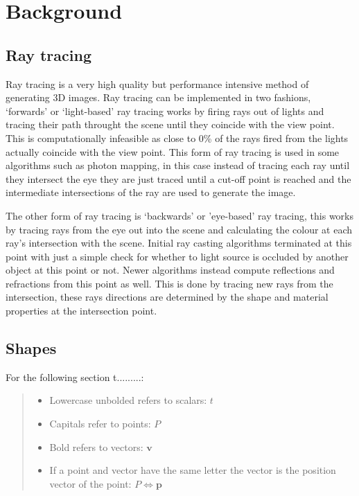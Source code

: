 \section{Background}
  \subsection{Ray tracing}
    Ray tracing is a very high quality but performance intensive method of
    generating 3D images.  Ray tracing can be implemented in two fashions,
    `forwards' or `light-based' ray tracing works by firing rays out of lights
    and tracing their path throught the scene until they coincide with the view
    point. This is computationally infeasible as close to 0\% of the rays fired
    from the lights actually coincide with the view point.  This form of ray
    tracing is used in some algorithms such as photon mapping, in this case
    instead of tracing each ray until they intersect the eye they are just
    traced until a cut-off point is reached and the intermediate intersections
    of the ray are used to generate the image.

    The other form of ray tracing is `backwards' or 'eye-based' ray tracing,
    this works by tracing rays from the eye out into the scene and calculating
    the colour at each ray's intersection with the scene.  Initial ray casting
    algorithms terminated at this point with just a simple check for whether to
    light source is occluded by another object at this point or not.  Newer
    algorithms instead compute reflections and refractions from this point as
    well. This is done by tracing new rays from the intersection, these rays
    directions are determined by the shape and material properties at the
    intersection point.

  \subsection{Shapes}
    For the following section t.........:
    \begin{quote}\begin{itemize}
      \item Lowercase unbolded refers to scalars: $t$
      \item Capitals refer to points: $P$
      \item Bold refers to vectors: $\mathbf{v}$
      \item If a point and vector have the same letter the vector is the
        position vector of the point: $P \Leftrightarrow \mathbf{p}$
    \end{itemize}\end{quote}

